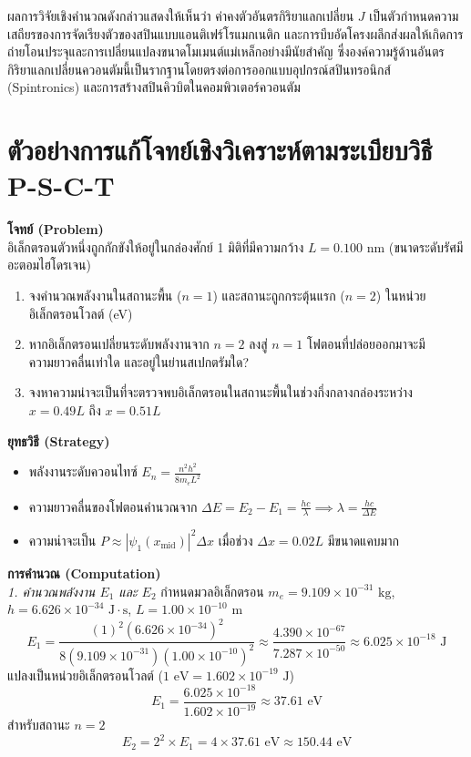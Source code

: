 ผลการวิจัยเชิงคำนวณดังกล่าวแสดงให้เห็นว่า ค่าคงตัวอันตรกิริยาแลกเปลี่ยน $J$ เป็นตัวกำหนดความเสถียรของการจัดเรียงตัวของสปินแบบแอนติเฟร์โรแมกเนติก และการบีบอัดโครงผลึกส่งผลให้เกิดการถ่ายโอนประจุและการเปลี่ยนแปลงขนาดโมเมนต์แม่เหล็กอย่างมีนัยสำคัญ ซึ่งองค์ความรู้ด้านอันตรกิริยาแลกเปลี่ยนควอนตัมนี้เป็นรากฐานโดยตรงต่อการออกแบบอุปกรณ์สปินทรอนิกส์ (Spintronics) และการสร้างสปินคิวบิตในคอมพิวเตอร์ควอนตัม

\section{ตัวอย่างการแก้โจทย์เชิงวิเคราะห์ตามระเบียบวิธี P-S-C-T}

\begin{psctexample}
\textbf{โจทย์ (Problem)} \\
อิเล็กตรอนตัวหนึ่งถูกกักขังให้อยู่ในกล่องศักย์ 1 มิติที่มีความกว้าง $L = 0.100\text{ nm}$ (ขนาดระดับรัศมีอะตอมไฮโดรเจน) 
\begin{enumerate}
    \item จงคำนวณพลังงานในสถานะพื้น ($n=1$) และสถานะถูกกระตุ้นแรก ($n=2$) ในหน่วยอิเล็กตรอนโวลต์ (eV)
    \item หากอิเล็กตรอนเปลี่ยนระดับพลังงานจาก $n=2$ ลงสู่ $n=1$ โฟตอนที่ปล่อยออกมาจะมีความยาวคลื่นเท่าใด และอยู่ในย่านสเปกตรัมใด?
    \item จงหาความน่าจะเป็นที่จะตรวจพบอิเล็กตรอนในสถานะพื้นในช่วงกึ่งกลางกล่องระหว่าง $x = 0.49L$ ถึง $x = 0.51L$
\end{enumerate}

\textbf{ยุทธวิธี (Strategy)} \\
\begin{itemize}
    \item พลังงานระดับควอนไทซ์ $E_n = \frac{n^2 h^2}{8m_e L^2}$
    \item ความยาวคลื่นของโฟตอนคำนวณจาก $\Delta E = E_2 - E_1 = \frac{hc}{\lambda} \implies \lambda = \frac{hc}{\Delta E}$
    \item ความน่าจะเป็น $P \approx |\psi_1(x_{\text{mid}})|^2 \Delta x$ เมื่อช่วง $\Delta x = 0.02L$ มีขนาดแคบมาก
\end{itemize}

\textbf{การคำนวณ (Computation)} \\
\textit{1. คำนวณพลังงาน $E_1$ และ $E_2$}
กำหนดมวลอิเล็กตรอน $m_e = 9.109 \times 10^{-31}\text{ kg}$, $h = 6.626 \times 10^{-34}\text{ J}\cdot\text{s}$, $L = 1.00 \times 10^{-10}\text{ m}$
\begin{equation}
E_1 = \frac{(1)^2 (6.626 \times 10^{-34})^2}{8 (9.109 \times 10^{-31}) (1.00 \times 10^{-10})^2} \approx \frac{4.390 \times 10^{-67}}{7.287 \times 10^{-50}} \approx 6.025 \times 10^{-18}\text{ J}
\end{equation}
แปลงเป็นหน่วยอิเล็กตรอนโวลต์ ($1\text{ eV} = 1.602 \times 10^{-19}\text{ J}$)
\begin{equation}
E_1 = \frac{6.025 \times 10^{-18}}{1.602 \times 10^{-19}} \approx 37.61\text{ eV}
\end{equation}
สำหรับสถานะ $n=2$
\begin{equation}
E_2 = 2^2 \times E_1 = 4 \times 37.61\text{ eV} \approx 150.44\text{ eV}
\end{equation}


\end{psctexample}
